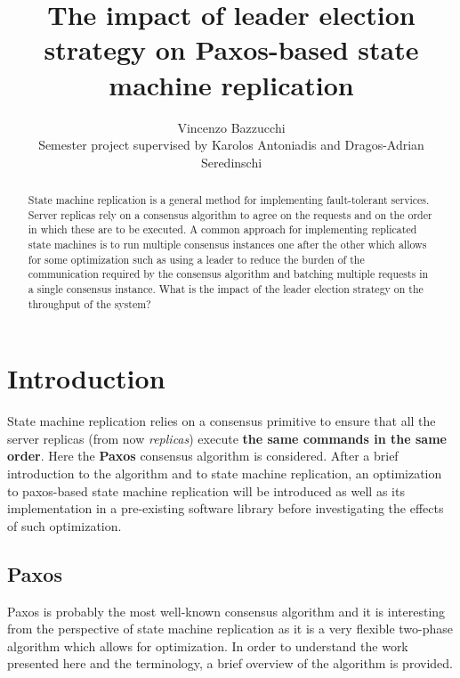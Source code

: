 \documentclass[a4paper, 10pt]{article}
\title{\Large \bf
The impact of leader election strategy on Paxos-based state machine replication
}
\author{Vincenzo Bazzucchi \\ Semester project supervised by Karolos Antoniadis and Dragos-Adrian Seredinschi}%
\begin{document}
\maketitle
\thispagestyle{empty}
\pagestyle{empty}


\begin{abstract}
State machine replication is a general method for implementing fault-tolerant services. Server replicas rely on a consensus algorithm to agree on the requests and on the order in which these are to be executed. A common approach for implementing replicated state machines is to run multiple consensus instances one after the other which allows for some optimization such as using a leader to reduce the burden of the communication required by the consensus algorithm and batching multiple requests in a single consensus instance. What is the impact of the leader election strategy on the throughput of the system?
\end{abstract}

\section{Introduction}
State machine replication relies on a consensus primitive to ensure that all the server replicas (from now \textit{replicas}) execute \textbf{the same commands in the same order}. Here the \textbf{Paxos} \cite{parttimeLamp}\cite{psimple} consensus algorithm is considered. After a brief introduction to the algorithm and to state machine replication, an optimization to paxos-based state machine replication will be introduced as well as its implementation in a pre-existing software library before investigating the effects of such optimization.

\subsection{Paxos}
Paxos is probably the most well-known consensus algorithm and it is interesting from the perspective of state machine replication as it is a very flexible two-phase algorithm which allows for optimization.
In order to understand the work presented here and the terminology, a brief overview of the algorithm is provided.
\end{document}
